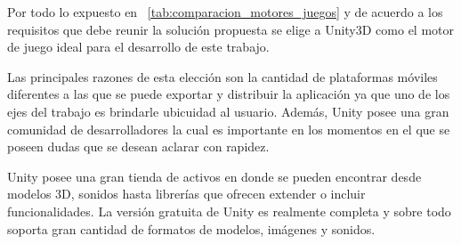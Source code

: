\restoregeometry

Por todo lo expuesto en ~\ref{tab:comparacion_motores_juegos} y de acuerdo a los requisitos que debe reunir
la solución propuesta se elige a Unity3D como el motor de juego ideal para el desarrollo de este trabajo.

Las principales razones de esta elección son la cantidad de plataformas móviles diferentes a las que se puede
exportar y distribuir la aplicación ya que uno de los ejes del trabajo es brindarle ubicuidad al usuario. Además, Unity posee una gran comunidad de desarrolladores la cual es importante en los momentos en el que
se poseen dudas que se desean aclarar con rapidez.

Unity posee una gran tienda de activos en donde se pueden encontrar desde modelos 3D, sonidos hasta librerías que ofrecen extender o incluir funcionalidades. La versión gratuita de Unity es realmente completa y sobre todo soporta gran cantidad de formatos de modelos, imágenes y sonidos.